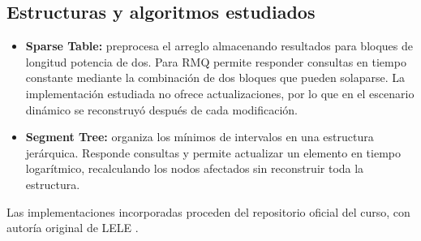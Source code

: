 \subsection{Estructuras y algoritmos estudiados}

\begin{itemize}
    \item \textbf{Sparse Table:} preprocesa el arreglo almacenando resultados
    para bloques de longitud potencia de dos. Para RMQ permite responder
    consultas en tiempo constante mediante la combinación de dos bloques
    que pueden solaparse. La implementación estudiada no ofrece
    actualizaciones, por lo que en el escenario dinámico se reconstruyó
    después de cada modificación.
    \item \textbf{Segment Tree:} organiza los mínimos de intervalos en una
    estructura jerárquica. Responde consultas y permite actualizar un
    elemento en tiempo logarítmico, recalculando los nodos afectados sin
    reconstruir toda la estructura.
\end{itemize}

Las implementaciones incorporadas proceden del repositorio oficial del curso,
con autoría original de LELE \cite{edaa-sparse-table,edaa-segment-tree}.

